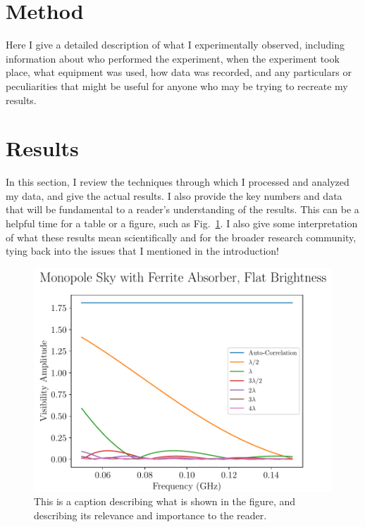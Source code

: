 \documentclass[preprint]{aastex}
\begin{document}
\section{Method}

Here I give a detailed description of what I experimentally observed, including 
information about who performed the experiment, when the experiment took place, 
what equipment was used, how data was recorded, and any particulars or 
peculiarities that might be useful for anyone who may be trying to recreate my 
results.

\section{Results}

In this section, I review the techniques through which I processed and analyzed 
my data, and give the actual results. I also provide the key numbers and data 
that will be fundamental to a reader's understanding of the results. This can 
be a helpful time for a table or a figure, such as 
Fig.~\ref{fig:figure-example}.  I also give some interpretation of what these 
results mean scientifically and for the broader research community, tying back 
into the issues that I mentioned in the introduction!

\begin{figure}
    \begin{center}
    \includegraphics[width=\linewidth]{fig_example}
    \end{center}
    \caption{
        This is a caption describing what is shown in the figure, and 
        describing its relevance and importance to the reader.
    }
    \label{fig:figure-example}
\end{figure}
\end{document}
